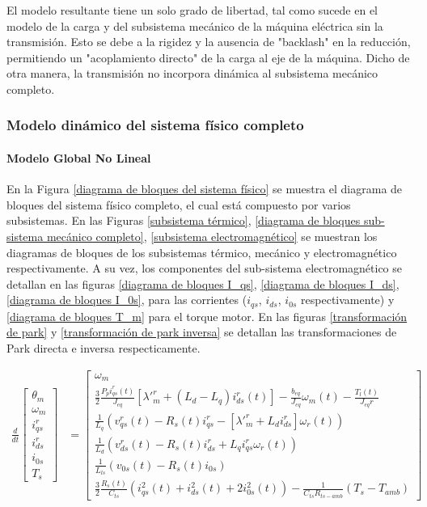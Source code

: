 \documentclass[a4paper, 10pt, onecolumn,journal]{ieeeconf}
\begin{document}
El modelo resultante tiene un solo grado de libertad, tal como sucede en el modelo de la carga y del subsistema mecánico de la máquina eléctrica sin la transmisión. Esto se debe a la rigidez y la ausencia de "backlash" en la reducción, permitiendo un "acoplamiento directo" de la carga al eje de la máquina. Dicho de otra manera, la transmisión no incorpora dinámica al subsistema mecánico completo.



\subsubsection{\textbf{Modelo dinámico del sistema físico completo}}
\paragraph{\textbf{Modelo Global No Lineal}}
En la Figura \ref{diagrama de bloques del sistema físico} se muestra
el diagrama de bloques del sistema físico completo, el cual está compuesto por varios subsistemas. En las Figuras \ref{subsistema térmico}, \ref{diagrama de bloques sub-sistema mecánico completo},
\ref{subsistema electromagnético} se muestran los diagramas de bloques de los subsistemas térmico, mecánico y electromagnético respectivamente. A su vez, los componentes del sub-sistema electromagnético se detallan
en las figuras \ref{diagrama de bloques I_qs}, \ref{diagrama de bloques I_ds}, \ref{diagrama de bloques I_0s}, para las corrientes ($i_{qs}$, $i_{ds}$, $i_{0s}$ respectivamente) y \ref{diagrama de bloques T_m} para el torque motor.
En las figuras \ref{transformación de park} y \ref{transformación de park inversa} se detallan las transformaciones de Park directa e inversa respecticamente.

\begin{align}
    \frac{d}{dt} \begin{bmatrix} \theta_m \\ \omega_m \\ i^r_{qs} \\ i^r_{ds} \\ i_{0s} \\ T_s \end{bmatrix} &= \begin{bmatrix} \omega_m \\ \frac{3}{2} \frac{P_p i^r_{qs}(t)}{J_{eq}} \left[ \lambda'^r_{m} + (L_d - L_q) i^r_{ds}(t) \right] - \frac{b_{eq}}{J_{eq}} \omega_m(t) - \frac{T_l(t)}{J_{eq}r} \\ \frac{1}{L_q} \left( v^r_{qs}(t) - R_s(t) i^r_{qs} - [\lambda'^r_m + L_d i^r_{ds}] \omega_r(t) \right) \\ \frac{1}{L_d} \left( v^r_{ds}(t) - R_s(t) i^r_{ds} + L_q i^r_{qs} \omega_r(t) \right) \\ \frac{1}{L_{ls}} \left( v_{0s}(t) - R_s(t) i_{0s} \right) \\ \frac{3}{2} \frac{R_s(t)}{C_{ts}} \left( i_{qs}^2(t) + i_{ds}^2(t) + 2 i_{0s}^2(t) \right) - \frac{1}{C_{ts}R_{ts-amb}} (T_s - T_{amb}) \end{bmatrix}
    \label{sistema vectorial de ecuaciones}
\end{align}
\end{document}
